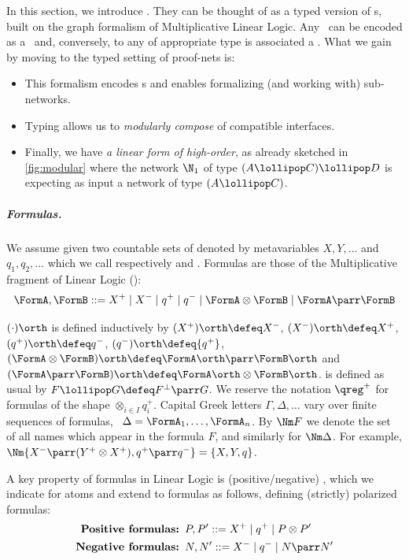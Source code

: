 In this section, we introduce \qpns.
They can be thought of as a typed version of \QBN s, built on the graph formalism of Multiplicative Linear Logic.
Any \QBN\ can be encoded as a \qpn\ and, conversely, to any \qpn of appropriate type is associated a \QBN.
What we gain by moving to the typed setting of proof-nets is:
\begin{itemize}
\item 
This formalism encodes \qqbn s and enables formalizing (and working with) sub-networks.
\item
Typing allows us to \emph{modularly compose} \qpns of compatible interfaces.
\item
Finally, we have \emph{a linear form of high-order}, as already sketched in \cref{fig:modular} where the network $\N_1$ of type $(A\lollipop C) \lollipop D$ is expecting as input a network of type $(A\lollipop C)$.
\end{itemize}

\subparagraph{Formulas.}

We assume given two countable sets of  denoted by metavariables $X, Y, \dots$ and $q_1, q_2, \dots$ which we call respectively  and .
Formulas are those of the Multiplicative fragment of Linear Logic (\MLL):
\begin{equation*}
	\FormA,\FormB ::=
	X^+	\mid X^- \mid q^+ \mid q^-
	\mid\FormA\otimes\FormB
	\mid\FormA\parr\FormB
\end{equation*}

 $(\cdot)\orth$ is defined inductively by
$(X^+)\orth\defeq X^-$,
$(X^-)\orth\defeq X^+$, 
$(q^+)\orth \defeq q^-$,
$(q^-)\orth \defeq {q^+}$,
$(\FormA\otimes\FormB)\orth \defeq\FormA\orth\parr\FormB\orth$ and
$(\FormA\parr\FormB)\orth \defeq\FormA\orth\otimes\FormB\orth$.
 is defined as usual by $F\lollipop G \defeq F^\bot \parr G$. 
We reserve the notation $\qreg^+$ for formulas of the shape $\otimes_{i\in I} q_i^+$.
Capital Greek letters $\Gamma,\Delta,\dots$ vary over finite sequences of formulas, \ie\ $\Delta = \FormA_1,\dots, \FormA_n$.
By $\Nm F$ we denote the set of all names which appear in the formula $F$, and similarly for $\Nm \Delta$.
For example, $\Nm{X^-\parr (Y^+\otimes X^+), q^+\parr q^-} =\{X,Y,q\}$.

A key property of formulas in Linear Logic is (positive/negative) , which we indicate for atoms and extend to formulas as follows, defining (strictly) polarized formulas:
\begin{align*}
\textbf{Positive formulas: }& P, P'::= X^+ \mid q^+ \mid P \otimes P'
\\
\textbf{Negative formulas: }& N, N'::= X^- \mid q^- \mid N \parr N'
\end{align*}

